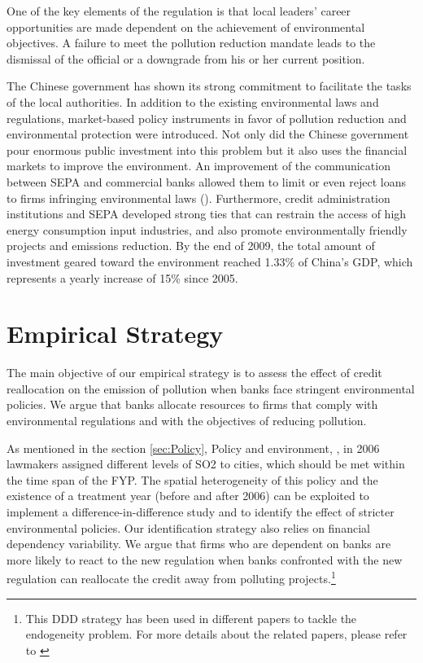 \documentclass[12pt]{article}
\begin{document}
One of the key elements of the regulation is that local leaders’ career opportunities are made dependent on the achievement of environmental objectives. A failure to meet the pollution reduction mandate leads to the dismissal of the official or a downgrade from his or her current position.

The Chinese government has shown its strong commitment to facilitate the tasks of the local authorities. In addition to the existing environmental laws and regulations, market-based policy instruments in favor of pollution reduction and environmental protection were introduced. Not only did the Chinese government pour enormous public investment into this problem but it also uses the financial markets to improve the environment. An improvement of the communication between SEPA and commercial banks allowed them to limit or even reject loans to firms infringing environmental laws (\cite{Oecd2008-pi}). Furthermore, credit administration institutions and SEPA developed strong ties that can restrain the access of high energy consumption input industries, and also promote environmentally friendly projects and emissions reduction. By the end of 2009, the total amount of investment geared toward the environment reached 1.33\% of China's GDP, which represents a yearly increase of 15\% since 2005. 

\section{Empirical Strategy} \label{sec:Empirical}

The main objective of our empirical strategy is to assess the effect of credit reallocation on the emission of pollution when banks face stringent environmental policies. We argue that banks allocate resources to firms that comply with environmental regulations and with the objectives of reducing pollution.

As mentioned in the section \ref{sec:Policy}, Policy and environment, , in 2006 lawmakers assigned different levels of SO2  to cities, which should be met within the time span of the FYP. The spatial heterogeneity of this policy and the existence of a treatment year (before and after 2006) can be exploited to implement a difference-in-difference study and to identify the effect of stricter environmental policies. Our identification strategy also relies on financial dependency variability. We argue that firms who are dependent on banks are more likely to react to the new regulation when banks confronted with the new regulation can reallocate the credit away from polluting projects.\footnote{This DDD strategy has been used in different papers to tackle the endogeneity problem. For more details about the related papers, please refer to \cite{Hering2014-af, Cai2016-br, Chen2018-ki, Shi2018-zk}}
\end{document}

